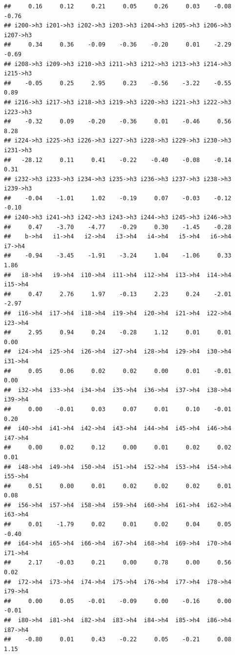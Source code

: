\documentclass[
]{article}
\begin{document}
\begin{verbatim}
##     0.16     0.12     0.21     0.05     0.26     0.03    -0.08    -0.76 
## i200->h3 i201->h3 i202->h3 i203->h3 i204->h3 i205->h3 i206->h3 i207->h3 
##     0.34     0.36    -0.09    -0.36    -0.20     0.01    -2.29    -0.69 
## i208->h3 i209->h3 i210->h3 i211->h3 i212->h3 i213->h3 i214->h3 i215->h3 
##    -0.05     0.25     2.95     0.23    -0.56    -3.22    -0.55     0.89 
## i216->h3 i217->h3 i218->h3 i219->h3 i220->h3 i221->h3 i222->h3 i223->h3 
##    -0.32     0.09    -0.20    -0.36     0.01    -0.46     0.56     8.28 
## i224->h3 i225->h3 i226->h3 i227->h3 i228->h3 i229->h3 i230->h3 i231->h3 
##   -28.12     0.11     0.41    -0.22    -0.40    -0.08    -0.14     0.31 
## i232->h3 i233->h3 i234->h3 i235->h3 i236->h3 i237->h3 i238->h3 i239->h3 
##    -0.04    -1.01     1.02    -0.19     0.07    -0.03    -0.12    -0.10 
## i240->h3 i241->h3 i242->h3 i243->h3 i244->h3 i245->h3 i246->h3 
##     0.47    -3.70    -4.77    -0.29     0.30    -1.45    -0.28 
##    b->h4   i1->h4   i2->h4   i3->h4   i4->h4   i5->h4   i6->h4   i7->h4 
##    -0.94    -3.45    -1.91    -3.24     1.04    -1.06     0.33     1.86 
##   i8->h4   i9->h4  i10->h4  i11->h4  i12->h4  i13->h4  i14->h4  i15->h4 
##     0.47     2.76     1.97    -0.13     2.23     0.24    -2.01    -2.97 
##  i16->h4  i17->h4  i18->h4  i19->h4  i20->h4  i21->h4  i22->h4  i23->h4 
##     2.95     0.94     0.24    -0.28     1.12     0.01     0.01     0.00 
##  i24->h4  i25->h4  i26->h4  i27->h4  i28->h4  i29->h4  i30->h4  i31->h4 
##     0.05     0.06     0.02     0.02     0.00     0.01    -0.01     0.00 
##  i32->h4  i33->h4  i34->h4  i35->h4  i36->h4  i37->h4  i38->h4  i39->h4 
##     0.00    -0.01     0.03     0.07     0.01     0.10    -0.01     0.20 
##  i40->h4  i41->h4  i42->h4  i43->h4  i44->h4  i45->h4  i46->h4  i47->h4 
##     0.00     0.02     0.12     0.00     0.01     0.02     0.02     0.01 
##  i48->h4  i49->h4  i50->h4  i51->h4  i52->h4  i53->h4  i54->h4  i55->h4 
##     0.51     0.00     0.01     0.02     0.02     0.02     0.01     0.08 
##  i56->h4  i57->h4  i58->h4  i59->h4  i60->h4  i61->h4  i62->h4  i63->h4 
##     0.01    -1.79     0.02     0.01     0.02     0.04     0.05    -0.40 
##  i64->h4  i65->h4  i66->h4  i67->h4  i68->h4  i69->h4  i70->h4  i71->h4 
##     2.17    -0.03     0.21     0.00     0.78     0.00     0.56     0.02 
##  i72->h4  i73->h4  i74->h4  i75->h4  i76->h4  i77->h4  i78->h4  i79->h4 
##     0.00     0.05    -0.01    -0.09     0.00    -0.16     0.00    -0.01 
##  i80->h4  i81->h4  i82->h4  i83->h4  i84->h4  i85->h4  i86->h4  i87->h4 
##    -0.80     0.01     0.43    -0.22     0.05    -0.21     0.08     1.15 

\end{verbatim}
\end{document}
